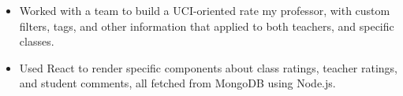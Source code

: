 \documentclass[letterpaper]{deedy-resume} %
\begin{document}
\begin{minipage}[t]{0.65\textwidth}
\begin{itemize}[leftmargin=.5cm]
\item 
Worked with a team to build a UCI-oriented rate my professor, with custom filters, tags, and other information that applied to both teachers, and specific classes.
\item
Used React to render specific components about class ratings, teacher ratings, and student comments, all fetched from MongoDB using Node.js.
\end{itemize}


\end{minipage} %
\end{document}
